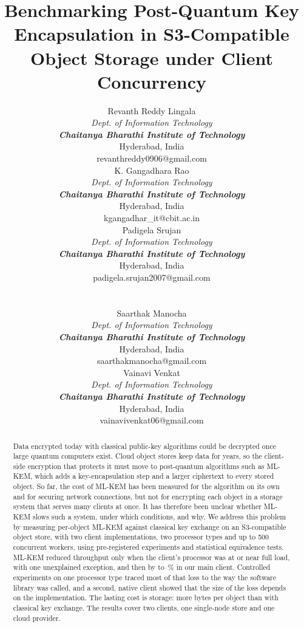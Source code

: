 \documentclass[conference]{IEEEtran}
\begin{document}
\title{Benchmarking Post-Quantum Key Encapsulation in S3-Compatible Object Storage under Client Concurrency}

\newcommand{\cbitauthor}[2]{\begin{minipage}[t]{0.3\textwidth}\centering
{\normalsize #1}\\[2pt]
{\footnotesize\textit{Dept. of Information Technology}\\
\textbf{\textit{Chaitanya Bharathi Institute of Technology}}\\
Hyderabad, India\\
#2}\end{minipage}}
\author{%
\cbitauthor{Revanth Reddy Lingala}{revanthreddy0906@gmail.com}\hfill
\cbitauthor{K. Gangadhara Rao}{kgangadhar\_it@cbit.ac.in}\hfill
\cbitauthor{Padigela Srujan}{padigela.srujan2007@gmail.com}\\[10pt]
\hspace*{\fill}\cbitauthor{Saarthak Manocha}{saarthakmanocha@gmail.com}\hspace{0.05\textwidth}%
\cbitauthor{Vainavi Venkat}{vainavivenkat06@gmail.com}\hspace*{\fill}}

\maketitle

\begin{abstract}
Data encrypted today with classical public-key algorithms could be decrypted once large quantum
computers exist. Cloud object stores keep data for years, so the client-side encryption that
protects it must move to post-quantum algorithms such as ML-KEM, which adds a key-encapsulation
step and a larger ciphertext to every stored object. So far, the cost of ML-KEM has been
measured for the algorithm on its own and for securing network connections, but not for
encrypting each object in a storage system that serves many clients at once. It has therefore
been unclear whether ML-KEM slows such a system, under which conditions, and why. We address
this problem by measuring per-object ML-KEM against classical key exchange on an S3-compatible
object store, with two client implementations, two processor types and up to 500 concurrent
workers, using pre-registered experiments and statistical equivalence tests. ML-KEM reduced
throughput only when the client's processor was at or near full load, with one unexplained
exception, and then by \RevHotDeficit{} to \ArmHotDeficit\,\% in our main client. Controlled
experiments on one processor type traced most of that loss to the way the software library was
called, and a second, native client showed that the size of the loss depends on the
implementation. The lasting cost is storage: \RevMetaIntrinsic{} more bytes per object than with
classical key exchange. The
results cover two clients, one single-node store and one cloud provider.
\end{abstract}
\end{document}
